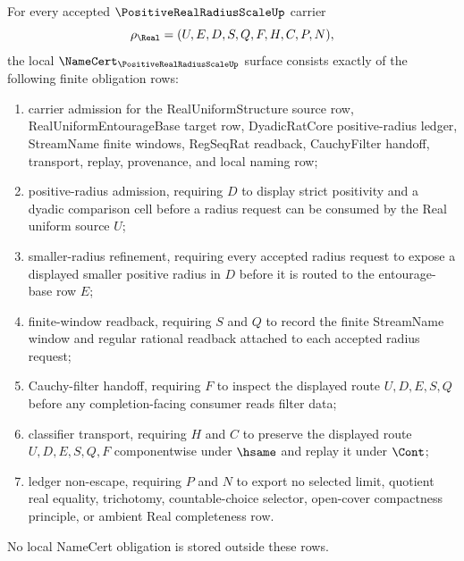 \begin{theorem}
\label{thm:positive-real-radius-scale-namecert-obligations}
For every accepted $\PositiveRealRadiusScaleUp$ carrier
$$
\rho_{\Real}=(U,E,D,S,Q,F,H,C,P,N),
$$
the local $\NameCert_{\PositiveRealRadiusScaleUp}$ surface consists exactly of the following finite obligation rows:
\begin{enumerate}
\item carrier admission for the RealUniformStructure source row, RealUniformEntourageBase target row, DyadicRatCore positive-radius ledger, StreamName finite windows, RegSeqRat readback, CauchyFilter handoff, transport, replay, provenance, and local naming row;
\item positive-radius admission, requiring $D$ to display strict positivity and a dyadic comparison cell before a radius request can be consumed by the Real uniform source $U$;
\item smaller-radius refinement, requiring every accepted radius request to expose a displayed smaller positive radius in $D$ before it is routed to the entourage-base row $E$;
\item finite-window readback, requiring $S$ and $Q$ to record the finite StreamName window and regular rational readback attached to each accepted radius request;
\item Cauchy-filter handoff, requiring $F$ to inspect the displayed route $U,D,E,S,Q$ before any completion-facing consumer reads filter data;
\item classifier transport, requiring $H$ and $C$ to preserve the displayed route $U,D,E,S,Q,F$ componentwise under $\hsame$ and replay it under $\Cont$;
\item ledger non-escape, requiring $P$ and $N$ to export no selected limit, quotient real equality, trichotomy, countable-choice selector, open-cover compactness principle, or ambient Real completeness row.
\end{enumerate}
No local NameCert obligation is stored outside these rows.
\end{theorem}
